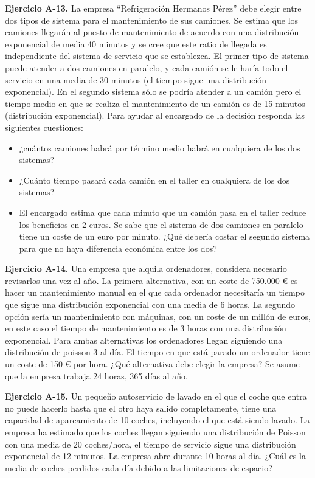 \documentclass[
]{book}
\providecommand{\tightlist}{%
  \setlength{\itemsep}{0pt}\setlength{\parskip}{0pt}}
\theoremstyle{definition}
\theoremstyle{definition}
\theoremstyle{definition}
\theoremstyle{definition}
\theoremstyle{remark}
\begin{document}
\textbf{Ejercicio A-13.} La empresa ``Refrigeración Hermanos Pérez'' debe elegir entre dos tipos de sistema para el mantenimiento de sus camiones. Se estima que los camiones llegarán al puesto de mantenimiento de acuerdo con una distribución exponencial de media 40 minutos y se cree que este ratio de llegada es independiente del sistema de servicio que se establezca. El primer tipo de sistema puede atender a dos camiones en paralelo, y cada camión se le haría todo el servicio en una media de 30 minutos (el tiempo sigue una distribución exponencial). En el segundo sistema sólo se podría atender a un camión pero el tiempo medio en que se realiza el mantenimiento de un camión es de 15 minutos (distribución exponencial). Para ayudar al encargado de la decisión responda las siguientes cuestiones:

\begin{itemize}
\tightlist
\item
  ¿cuántos camiones habrá por término medio habrá en cualquiera de los dos sistemas?
\item
  ¿Cuánto tiempo pasará cada camión en el taller en cualquiera de los dos sistemas?
\item
  El encargado estima que cada minuto que un camión pasa en el taller reduce los beneficios en 2 euros. Se sabe que el sistema de dos camiones en paralelo tiene un coste de un euro por minuto. ¿Qué debería costar el segundo sistema para que no haya diferencia económica entre los dos?
\end{itemize}

\textbf{Ejercicio A-14.} Una empresa que alquila ordenadores, considera necesario revisarlos una vez al año. La primera alternativa, con un coste de 750.000 € es hacer un mantenimiento manual en el que cada ordenador necesitaría un tiempo que sigue una distribución exponencial con una media de 6 horas. La segundo opción sería un mantenimiento con máquinas, con un coste de un millón de euros, en este caso el tiempo de mantenimiento es de 3 horas con una distribución exponencial. Para ambas alternativas los ordenadores llegan siguiendo una distribución de poisson 3 al día. El tiempo en que está parado un ordenador tiene un coste de 150 € por hora. ¿Qué alternativa debe elegir la empresa? Se asume que la empresa trabaja 24 horas, 365 días al año.

\textbf{Ejercicio A-15.} Un pequeño autoservicio de lavado en el que el coche que entra no puede hacerlo hasta que el otro haya salido completamente, tiene una capacidad de aparcamiento de 10 coches, incluyendo el que está siendo lavado. La empresa ha estimado que los coches llegan siguiendo una distribución de Poisson con una media de 20 coches/hora, el tiempo de servicio sigue una distribución exponencial de 12 minutos. La empresa abre durante 10 horas al día. ¿Cuál es la media de coches perdidos cada día debido a las limitaciones de espacio?
\end{document}
